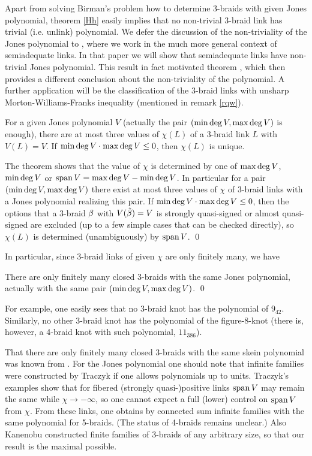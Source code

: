 Apart from solving Birman's problem how to determine 3-braids
with given Jones polynomial, theorem \ref{Hh} easily implies that
no non-trivial 3-braid link has trivial (i.e. unlink) polynomial. We
defer the discussion of the non-triviality of the Jones polynomial
to \cite{ntriv}, where we work in the much more general context of
semiadequate links. In that paper we will show that semiadequate
links have non-trivial Jones polynomial. This result in fact motivated
theorem , which then provides a different conclusion
about the non-triviality of the polynomial. A further application
will be the classification of the 3-braid links with unsharp
Morton-Williams-Franks inequality (mentioned in remark \ref{rqw}).

\begin{corr}\label{fintg}
For a given Jones polynomial $V$ (actually the pair
$(\min\deg V,\max\deg V)$ is enough), there are at most three
values of $\chi(L)$ of a 3-braid link $L$ with $V(L)=V$.
If $\min\deg V\cdot \max\deg V\le 0$, then $\chi(L)$ is unique.
\end{corr}

\proof The theorem shows that the value of $\chi$ is determined
by one of $\max\deg V$, $\min\deg V$ or $\spn V=\Md V-\md V$.
In particular for a pair $(\min\deg V,\max\deg V)$ there exist at most three
values of $\chi$ of 3-braid links with a Jones polynomial realizing
this pair. If $\min\deg V\cdot \max\deg V\le 0$, then the options that a 3-braid
$\beta$ with $V(\hat{\beta})=V$ is strongly quasi-signed or almost
quasi-signed are excluded (up to a few simple cases that can be
checked directly), so $\chi(L)$ is determined (unambiguously) by
$\spn V$. \qed

In particular, since 3-braid links of given $\chi$
are only finitely many, we have

\begin{corr}\label{finth}
There are only finitely many closed 3-braids with the same
Jones polynomial, actually with the same pair $(\min\deg V,\max\deg V)$. \qed
\end{corr}

For example, one
easily sees that no 3-braid knot has the polynomial of $9_{42}$.
Similarly, no other 3-braid knot has the polynomial of the figure-8-knot
(there is, however, a 4-braid knot with such polynomial, $11_{386}$).

That there are only finitely many closed 3-braids with the same
skein polynomial was known from \cite{3br}. For the Jones polynomial
one should note that infinite families were constructed
by Traczyk \cite{Traczyk} if one allows polynomials up to units.
Traczyk's examples show that for fibered
(strongly quasi-)positive links $\spn V$ may remain the same
while $\chi\to-\infty$, so one cannot expect a full (lower) 
control on $\spn V$ from $\chi$. From these links, one obtains
by connected sum infinite families with the same
polynomial for 5-braids. (The status of 4-braids remains unclear.)
Also Kanenobu \cite{Kanenobu2} constructed finite families of 3-braids
of any arbitrary size, so that our result is the maximal possible.

